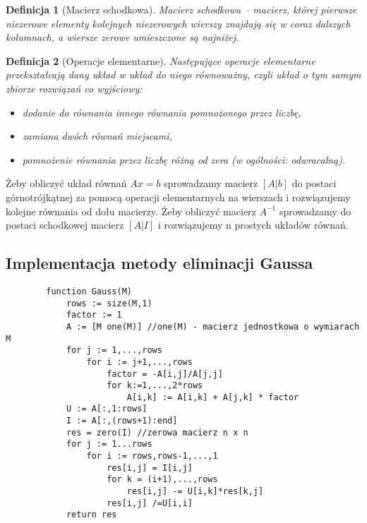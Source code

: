 \documentclass[11pt,a4paper]{article}
\newtheorem{defn}{Definicja}
\begin{document}
    \begin{defn}[Macierz schodkowa]
        Macierz schodkowa – macierz, której pierwsze niezerowe elementy kolejnych niezerowych wierszy znajdują się w coraz dalszych kolumnach, a wiersze zerowe umieszczone są najniżej.
    \end{defn}

    \begin{defn}[Operacje elementarne]
        Następujące operacje elementarne przekształcają dany układ w układ do niego równoważny, czyli układ o tym samym zbiorze rozwiązań co wyjściowy:

        \begin{itemize}
        \item dodanie do równania innego równania pomnożonego przez liczbę,
        \item zamiana dwóch równań miejscami,
        \item pomnożenie równania przez liczbę różną od zera (w ogólności: odwracalną).
        \end{itemize}
    \end{defn}

    Żeby obliczyć układ równań $Ax=b$ sprowadzamy macierz $[A | b]$ do postaci górnotrójkątnej za pomocą operacji elementarnych na wierszach i rozwiązujemy kolejne równania od dołu macierzy. Żeby obliczyć macierz $A^{-1}$ sprowadzamy do postaci schodkowej macierz $[A | I]$ i rozwiązujemy n prostych układów równań.

    \subsection{Implementacja metody eliminacji Gaussa}
    \begin{verbatim}
        function Gauss(M)
            rows := size(M,1)
            factor := 1
            A := [M one(M)] //one(M) - macierz jednostkowa o wymiarach M
            for j := 1,...,rows
                for i := j+1,...,rows
                    factor = -A[i,j]/A[j,j]
                    for k:=1,...,2*rows
                        A[i,k] := A[i,k] + A[j,k] * factor
            U := A[:,1:rows]
            I := A[:,(rows+1):end]
            res = zero(I) //zerowa macierz n x n
            for j := 1...rows
                for i := rows,rows-1,...,1
                    res[i,j] = I[i,j]
                    for k = (i+1),...,rows
                        res[i,j] -= U[i,k]*res[k,j]
                    res[i,j] /=U[i,i]
            return res
    \end{verbatim}
\end{document}
